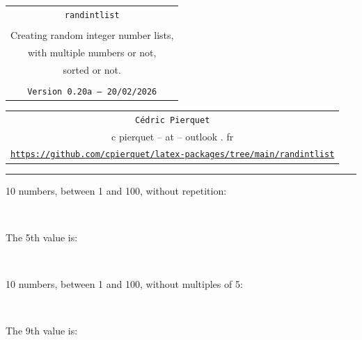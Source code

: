 \documentclass[11pt,a4paper]{ltxdoc}
\def\TPversion{0.20a}
\def\TPdate{20/02/2026}
\begin{document}
\thispagestyle{empty}

\begin{center}
	\begin{minipage}{0.88\linewidth}
		\begin{tcolorbox}[colframe=yellow,colback=yellow!15]
			\begin{center}
				\renewcommand{\arraystretch}{1.25}%
				\begin{tabular}{c}
					{\Huge \texttt{randintlist}}\\
					\\
					{\LARGE Creating random integer number lists,} \\
					{\LARGE with multiple numbers or not,} \\
					{\LARGE sorted or not.} \\
					\\
					{\small \texttt{Version \TPversion{} -- \TPdate}}
				\end{tabular}
			\end{center}
		\end{tcolorbox}
	\end{minipage}
\end{center}

\begin{center}
	\begin{tabular}{c}
		\texttt{Cédric Pierquet}\\
		{\ttfamily c pierquet -- at -- outlook . fr}\\
		\texttt{\url{https://github.com/cpierquet/latex-packages/tree/main/randintlist}} \\
	\end{tabular}
\end{center}

\hrule

\vfill

\begin{tcolorbox}[colframe=lightgray,colback=lightgray!5]
10 numbers, between 1 and 100, without repetition:

\hfill\randintlist[min=1,max=100,nb=10]{\mylist}\textcolor{red}{\mylist}\hfill~

The 5th value is:

\hfill\textcolor{blue}{}\hfill~
\end{tcolorbox}

\begin{tcolorbox}[colframe=lightgray,colback=lightgray!5]
10 numbers, between 1 and 100, without multiples of 5:

\hfill\randintlist[min=1,max=100,nb=10,exclude={5,10,15,20,25,30,35,40,45,50,55,60,65,70,75,80,85,90,95,100}]{\mylist}\textcolor{olive}{\mylist}\hfill~

The 9th value is:

\hfill\textcolor{purple}{}\hfill~
\end{tcolorbox}
\end{document}
